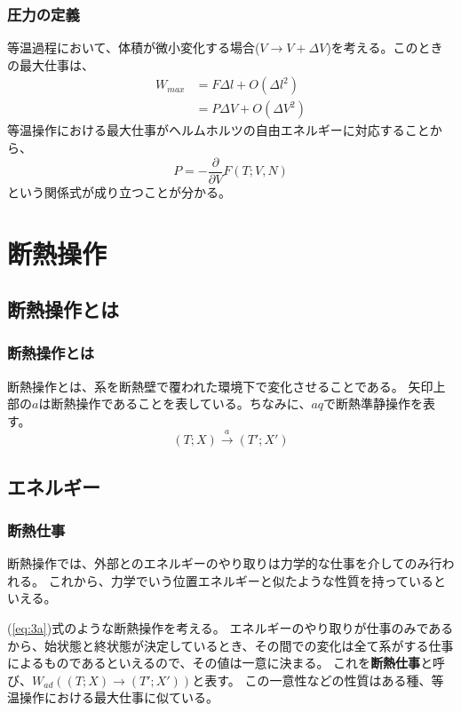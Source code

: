 \documentclass[a4paper]{jsreport}
\begin{document}
            \subsection*{圧力の定義}
                等温過程において、体積が微小変化する場合($V \rightarrow{} V + \Delta V$)を考える。このときの最大仕事は、
                \begin{align}
                    W_{max} &= F \Delta l + O(\Delta l^2) \\
                    &= P \Delta V + O(\Delta V^2)
                \end{align}
                等温操作における最大仕事がヘルムホルツの自由エネルギーに対応することから、
                \begin{equation}
                    P = -\frac{\partial}{\partial V} F(T; V, N)
                \end{equation}
                という関係式が成り立つことが分かる。


    \chapter{断熱操作}

        \section{断熱操作とは}
            \subsection*{断熱操作とは}
                断熱操作とは、系を断熱壁で覆われた環境下で変化させることである。
                矢印上部の$a$は断熱操作であることを表している。ちなみに、$aq$で断熱準静操作を表す。
                \begin{equation} \label{eq:3a}
                    (T; X)\xrightarrow{a}(T'; X')
                \end{equation}
                    
        \section{エネルギー}

            \subsection*{断熱仕事}
                断熱操作では、外部とのエネルギーのやり取りは力学的な仕事を介してのみ行われる。
                これから、力学でいう位置エネルギーと似たような性質を持っているといえる。\par
                (\ref{eq:3a})式のような断熱操作を考える。
                エネルギーのやり取りが仕事のみであるから、始状態と終状態が決定しているとき、その間での変化は全て系がする仕事によるものであるといえるので、その値は一意に決まる。
                これを\textbf{断熱仕事}と呼び、$W_{ad}((T; X)\xrightarrow{}(T'; X'))$と表す。
                この一意性などの性質はある種、等温操作における最大仕事に似ている。
                            
\end{document}
